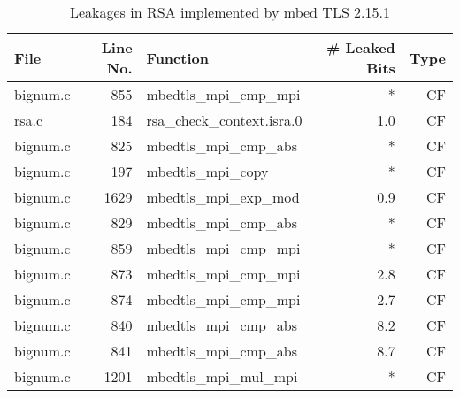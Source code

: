 \begin{table}[!ht]
\centering\tiny\scriptsize
\caption{Leakages in RSA implemented by mbed TLS 2.15.1}\label{tab:RSAmbed TLS2.15.1}
\begin{tabular}{lrlrr}
\hline
\textbf{File} & \textbf{Line No.} & \textbf{Function} & \textbf{\# Leaked Bits} & \textbf{Type} \\\hline
bignum.c& 855&mbedtls\_mpi\_cmp\_mpi&*&CF\\
rsa.c& 184&rsa\_check\_context.isra.0&1.0 &CF\\
bignum.c& 825&mbedtls\_mpi\_cmp\_abs&*&CF\\
bignum.c& 197&mbedtls\_mpi\_copy&*&CF\\
bignum.c& 1629&mbedtls\_mpi\_exp\_mod&0.9 &CF\\
bignum.c& 829&mbedtls\_mpi\_cmp\_abs&*&CF\\
bignum.c& 859&mbedtls\_mpi\_cmp\_mpi&*&CF\\
bignum.c& 873&mbedtls\_mpi\_cmp\_mpi&2.8 &CF\\
bignum.c& 874&mbedtls\_mpi\_cmp\_mpi&2.7 &CF\\
bignum.c& 840&mbedtls\_mpi\_cmp\_abs&8.2 &CF\\
bignum.c& 841&mbedtls\_mpi\_cmp\_abs&8.7 &CF\\
bignum.c& 1201&mbedtls\_mpi\_mul\_mpi&*&CF\\
\hline
\end{tabular}
\renewcommand{\baselinestretch}{1.0}\selectfont
\end{table}
